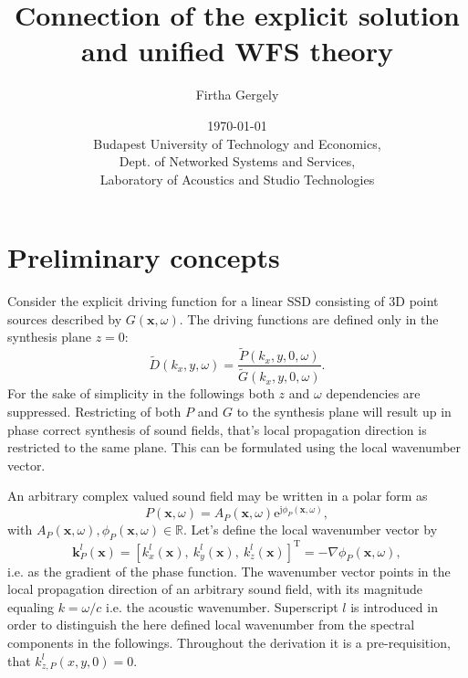 \documentclass[12pt,a4paper]{article}
\title{Connection of the explicit solution and unified WFS theory}
\date{\today \\
Budapest University of Technology and Economics, \\ Dept. of Networked Systems and Services, \\ Laboratory of Acoustics and Studio Technologies}
\author{Firtha Gergely}
\newcommand{\te}{\mathrm{e}}
\newcommand{\ti}{\mathrm{j}}
\newcommand{\vx}{\mathbf{x}}
\newcommand{\vk}{\mathbf{k}}
\begin{document}
\maketitle

\section{Preliminary concepts}
Consider the explicit driving function for a linear SSD consisting of 3D point sources described by $G(\vx,\omega)$. The driving functions are defined only in the synthesis plane $z=0$:
\begin{equation}
\tilde{D}(k_x,y,\omega) = \frac{\tilde{P}(k_x,y,0,\omega)}{\tilde{G}(k_x,y,0,\omega)}. 
\end{equation}
For the sake of simplicity in the followings both $z$ and $\omega$ dependencies are suppressed.
Restricting of both $P$ and $G$ to the synthesis plane will result up in phase correct synthesis of sound fields, that's local propagation direction is restricted to the same plane. This can be formulated using the local wavenumber vector.

An arbitrary complex valued sound field may be written in a polar form as
\begin{equation}
P(\vx,\omega) = A_P(\vx,\omega) \te^{\ti \phi_P (\vx,\omega)},
\end{equation}
with $A_P(\vx,\omega), \phi_P(\vx,\omega) \in \mathbb{R} $.
Let's define the local wavenumber vector by
\begin{equation}
\vk^l_P(\vx) = [k_x^l(\vx),\ k_y^l(\vx),\ k_z^l(\vx)]^{\mathrm{T}} = -\nabla \phi_P(\vx,\omega),
\end{equation}
i.e. as the gradient of the phase function. The wavenumber vector points in the local propagation direction of an arbitrary sound field, with its magnitude equaling $k = \omega/c$ i.e. the acoustic wavenumber. Superscript $l$ is introduced in order to distinguish the here defined local wavenumber from the spectral components in the followings. Throughout the derivation it is a pre-requisition, that $k_{z,P}^l(x,y,0) = 0$. 
\end{document}
